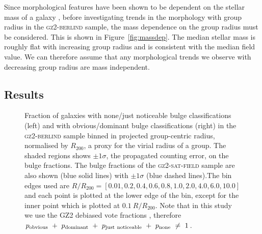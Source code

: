 \documentclass[useAMS,usenatbib]{mn2e}
\begin{document}
Since morphological features have been shown to be dependent on the stellar mass of a galaxy \citep[e.g. the increase in the bar fraction with stellar mass; see][]{nair10, skibba12}, before investigating trends in the morphology with group radius in the \textsc{gz2-berlind} sample, the mass dependence on the group radius must be considered. This is shown in Figure~\ref{fig:massdep}. The median stellar mass is roughly flat with increasing group radius and is consistent with the median field value. We can therefore assume that any morphological trends we observe with decreasing group radius are mass independent.

\subsection{Results}

\begin{figure}
\caption[Bulge fraction with group radius in the \textsc{gz2-berlind} sample]{Fraction of galaxies with none/just noticeable bulge classifications (left) and with obvious/dominant bulge classifications (right) in the \textsc{gz2-berlind} sample binned in projected group-centric radius, normalised by $R_{200}$, a proxy for the virial radius of a group. The shaded regions shows $\pm1\sigma$, the propagated counting error, on the bulge fractions. The bulge fractions of the \textsc{gz2-sat-field} sample are also shown (blue solid lines) with $\pm1\sigma$ (blue dashed lines).The bin edges used are $R/R_{200} =  [0.01 ,   0.2,   0.4,   0.6,   0.8,   1.0 ,   2.0 ,   4.0 ,   6.0 ,  10.0]$ and each point is plotted at the lower edge of the bin, except for the inner point which is plotted at $0.1~R/R_{200}$. Note that in this study we use the GZ2 debiased vote fractions \citep[adjusted for classification bias, see][]{GZ2}, therefore $p_{\rm{obvious}}~+~p_{\rm{dominant}}~+~p_{\rm{just}~\rm{noticeable}}~+~p_{\rm{none}}~\neq~1$.}
\label{fig:bulgeradius}
\end{figure}
\end{document}
